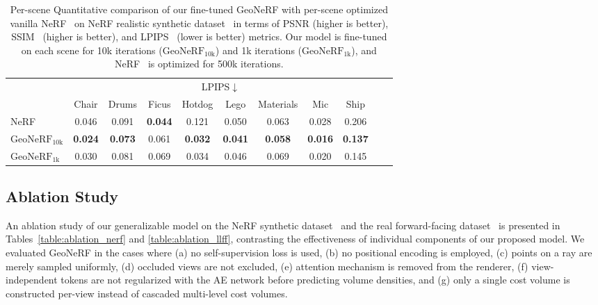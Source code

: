 \begin{table}[!t]
    \begin{center}
        \begin{threeparttable}
            \begin{tabular}{l|cccccccccc}
            & \multicolumn{8}{c}{LPIPS$\downarrow$} \\
            &  Chair & Drums & Ficus & Hotdog & Lego & Materials & Mic & Ship \\
            \hline
            NeRF & 0.046 & 0.091 & \textbf{0.044} & 0.121 & 0.050 & 0.063 & 0.028 & 0.206 \\
            $\text{GeoNeRF}_{\text{10k}}$ & \textbf{0.024} & \textbf{0.073} & 0.061 & \textbf{0.032} & \textbf{0.041} & \textbf{0.058} & \textbf{0.016} & \textbf{0.137} \\
            $\text{GeoNeRF}_{\text{1k}}$ & 0.030 & 0.081 & 0.069 & 0.034 & 0.046 & 0.069 & 0.020 & 0.145 \\            
            \hline
            \end{tabular}
        \end{threeparttable}
    \end{center}
    \vspace{3.0ex}
    \caption{Per-scene Quantitative comparison of our fine-tuned GeoNeRF with per-scene optimized vanilla NeRF~\cite{mildenhall2020nerf} on NeRF realistic synthetic dataset~\cite{mildenhall2020nerf} in terms of PSNR (higher is better), SSIM~\cite{wang2004image} (higher is better), and LPIPS~\cite{zhang2018unreasonable} (lower is better) metrics. Our model is fine-tuned on each scene for 10k iterations ($\text{GeoNeRF}_{\text{10k}}$) and 1k iterations ($\text{GeoNeRF}_{\text{1k}}$), and NeRF~\cite{mildenhall2020nerf} is optimized for 500k iterations.}
    \label{table:per_scene_ft_nerf}
\end{table}

\subsection{Ablation Study} \label{sec:c3_ablation}
An ablation study of our generalizable model on the NeRF synthetic dataset~\cite{mildenhall2020nerf} and the real forward-facing dataset~\cite{mildenhall2019llff} is presented in Tables~\ref{table:ablation_nerf} and \ref{table:ablation_llff}, contrasting the effectiveness of individual components of our proposed model. We evaluated GeoNeRF in the cases where (a) no self-supervision loss is used, (b) no positional encoding is employed, (c) points on a ray are merely sampled uniformly, (d) occluded views are not excluded, (e) attention mechanism is removed from the renderer, (f) view-independent tokens are not regularized with the AE network before predicting volume densities, and (g) only a single cost volume is constructed per-view instead of cascaded multi-level cost volumes.

